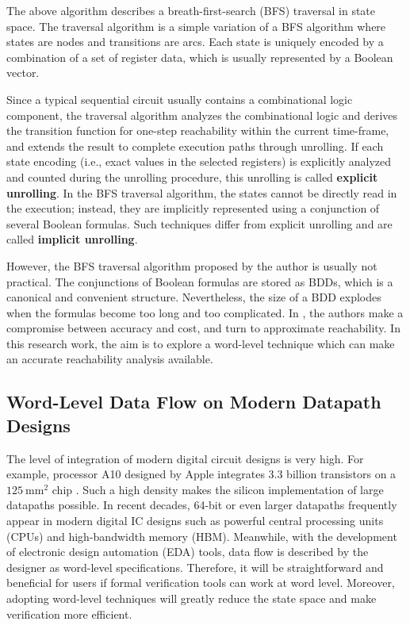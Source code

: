 The above algorithm describes a breath-first-search (BFS) traversal in
state space. The traversal algorithm is a simple variation of a BFS algorithm where 
states are nodes and transitions are arcs. Each state is uniquely encoded by a combination
of a set of register data, which is usually represented by a Boolean vector. 

Since a typical sequential circuit usually contains a combinational logic
component, the traversal algorithm analyzes the combinational logic and derives the transition 
function for one-step reachability within the current time-frame, and extends the result to complete 
execution paths through unrolling. If each state encoding (i.e., exact values in the selected registers) is
explicitly analyzed and counted during the unrolling 
procedure, this unrolling is called {\bf explicit unrolling}. In the BFS traversal algorithm, the states cannot be 
directly read in the execution; instead, they are implicitly represented using a conjunction of several 
Boolean formulas. Such techniques differ from explicit unrolling and are called {\bf implicit unrolling}.

However, the BFS traversal algorithm proposed by the author is usually not practical. The conjunctions of 
Boolean formulas are stored as BDDs, which is a canonical and convenient structure. Nevertheless, 
the size of a BDD explodes when the formulas become too long and too complicated. In \cite{cho1993redundancy},
the authors make a compromise between accuracy and cost, and turn to approximate reachability. 
In this research work, the aim is to explore a word-level technique which can make an accurate reachability
analysis available.

\subsection{Word-Level Data Flow on Modern Datapath Designs}
The level of integration of modern digital circuit designs is very high. For example, processor A10 designed by Apple
integrates 3.3 billion transistors on a $125~\text{mm}^2$ chip \cite{AppleA10}. Such a high density makes the silicon 
implementation of large datapaths possible. In recent decades, 64-bit or even larger datapaths frequently appear in 
modern digital IC designs such as powerful central processing units (CPUs) and high-bandwidth memory (HBM).
Meanwhile, with the development of electronic design automation (EDA) tools, data flow 
is described by the designer as word-level specifications. Therefore, it will be straightforward 
and beneficial for users if formal verification tools can work at word level. Moreover, adopting word-level 
techniques will greatly reduce the state space and make verification more efficient.

